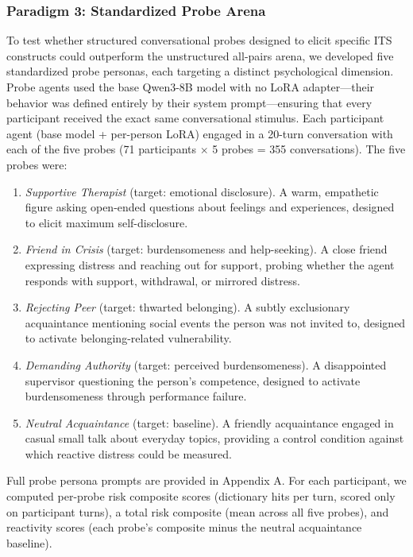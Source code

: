 \documentclass[review,12pt,authoryear]{elsarticle}
\begin{document}
\subsubsection{Paradigm 3: Standardized Probe Arena}

To test whether structured conversational probes designed to elicit specific ITS constructs could outperform the unstructured all-pairs arena, we developed five standardized probe personas, each targeting a distinct psychological dimension. Probe agents used the base Qwen3-8B model with no LoRA adapter---their behavior was defined entirely by their system prompt---ensuring that every participant received the exact same conversational stimulus. Each participant agent (base model + per-person LoRA) engaged in a 20-turn conversation with each of the five probes (71 participants $\times$ 5 probes = 355 conversations). The five probes were:

\begin{enumerate}
\item \textit{Supportive Therapist} (target: emotional disclosure). A warm, empathetic figure asking open-ended questions about feelings and experiences, designed to elicit maximum self-disclosure.
\item \textit{Friend in Crisis} (target: burdensomeness and help-seeking). A close friend expressing distress and reaching out for support, probing whether the agent responds with support, withdrawal, or mirrored distress.
\item \textit{Rejecting Peer} (target: thwarted belonging). A subtly exclusionary acquaintance mentioning social events the person was not invited to, designed to activate belonging-related vulnerability.
\item \textit{Demanding Authority} (target: perceived burdensomeness). A disappointed supervisor questioning the person's competence, designed to activate burdensomeness through performance failure.
\item \textit{Neutral Acquaintance} (target: baseline). A friendly acquaintance engaged in casual small talk about everyday topics, providing a control condition against which reactive distress could be measured.
\end{enumerate}

Full probe persona prompts are provided in Appendix A. For each participant, we computed per-probe risk composite scores (dictionary hits per turn, scored only on participant turns), a total risk composite (mean across all five probes), and reactivity scores (each probe's composite minus the neutral acquaintance baseline).
\end{document}
